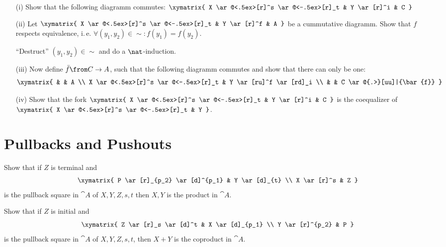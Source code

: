 \begin{exercise}
\begin{itemize}
      \begin{itemize}
        \item[(i)]Show that the following diagramm commutes:
          $\xymatrix{
            X \ar@<.5ex>[r]^s \ar@<-.5ex>[r]_t & Y \ar[r]^i & C
          }$
        \item[(ii)]Let
          $\xymatrix{
            X \ar@<.5ex>[r]^s \ar@<-.5ex>[r]_t & Y \ar[r]^f & A
          }$
          be a cummutative diagramm. Show that $f$ respects equivalence, i.\,e. $\forall (y_1, y_2) \in \sim: f(y_1) = f(y_2)$.
          \begin{hint}
            ``Destruct'' $(y_1, y_2) \in \sim$ and do a $\nat$-induction.
          \end{hint}
        \item[(iii)]Now define $\bar{f} \from C \to A$, such that the following diagramm commutes and show that there can only be one:
          \[ \xymatrix{
            & & A  \\
            X \ar@<.5ex>[r]^s \ar@<-.5ex>[r]_t & Y \ar[ru]^f \ar[rd]_i \\
            & & C \ar@{.>}[uu]|{\bar{f}}
          } \]
        \item[(iv)]Show that the fork
          $\xymatrix{
            X \ar@<.5ex>[r]^s \ar@<-.5ex>[r]_t & Y \ar[r]^i & C
          }$
          is the coequalizer of
          $\xymatrix{
            X \ar@<.5ex>[r]^s \ar@<-.5ex>[r]_t & Y
          }$.
      \end{itemize}
  \end{itemize}
\end{exercise}

\section{Pullbacks and Pushouts}

\begin{exercise}
  Show that if $Z$ is terminal and
  \[ \xymatrix{
    P \ar[r]_{p_2} \ar[d]^{p_1} & Y \ar[d]_{t} \\
    X \ar[r]^s & Z
  } \]
  is the pullback square in $\cat{A}$ of $X, Y, Z, s, t$ then $X, Y$ is the product in $\cat{A}$.
\end{exercise}

\begin{exercise}
  Show that if $Z$ is initial and
  \[ \xymatrix{
    Z \ar[r]_s \ar[d]^t & X \ar[d]_{p_1} \\
    Y \ar[r]^{p_2} & P
  } \]
  is the pullback square in $\cat{A}$ of $X, Y, Z, s, t$, then $X + Y$ is the coproduct in $\cat{A}$.
\end{exercise}



